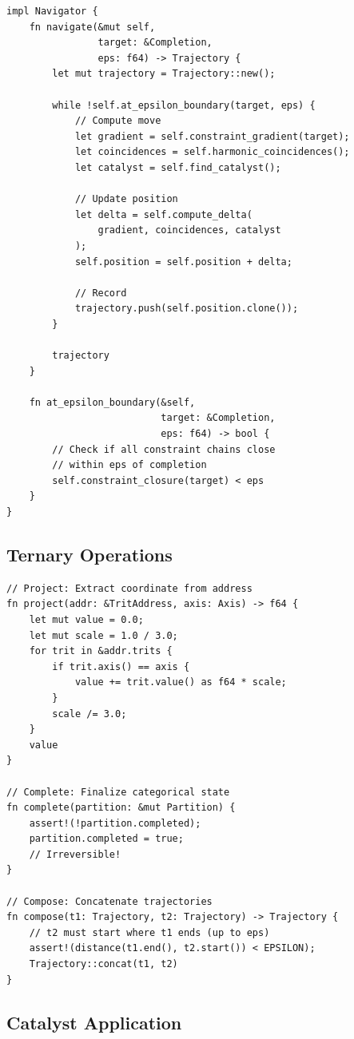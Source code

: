 \documentclass[twocolumn,10pt]{article}
\theoremstyle{remark}
\begin{document}
\begin{lstlisting}
impl Navigator {
    fn navigate(&mut self,
                target: &Completion,
                eps: f64) -> Trajectory {
        let mut trajectory = Trajectory::new();

        while !self.at_epsilon_boundary(target, eps) {
            // Compute move
            let gradient = self.constraint_gradient(target);
            let coincidences = self.harmonic_coincidences();
            let catalyst = self.find_catalyst();

            // Update position
            let delta = self.compute_delta(
                gradient, coincidences, catalyst
            );
            self.position = self.position + delta;

            // Record
            trajectory.push(self.position.clone());
        }

        trajectory
    }

    fn at_epsilon_boundary(&self,
                           target: &Completion,
                           eps: f64) -> bool {
        // Check if all constraint chains close
        // within eps of completion
        self.constraint_closure(target) < eps
    }
}
\end{lstlisting}

\subsection{Ternary Operations}

\begin{lstlisting}
// Project: Extract coordinate from address
fn project(addr: &TritAddress, axis: Axis) -> f64 {
    let mut value = 0.0;
    let mut scale = 1.0 / 3.0;
    for trit in &addr.trits {
        if trit.axis() == axis {
            value += trit.value() as f64 * scale;
        }
        scale /= 3.0;
    }
    value
}

// Complete: Finalize categorical state
fn complete(partition: &mut Partition) {
    assert!(!partition.completed);
    partition.completed = true;
    // Irreversible!
}

// Compose: Concatenate trajectories
fn compose(t1: Trajectory, t2: Trajectory) -> Trajectory {
    // t2 must start where t1 ends (up to eps)
    assert!(distance(t1.end(), t2.start()) < EPSILON);
    Trajectory::concat(t1, t2)
}
\end{lstlisting}

\subsection{Catalyst Application}
\end{document}
